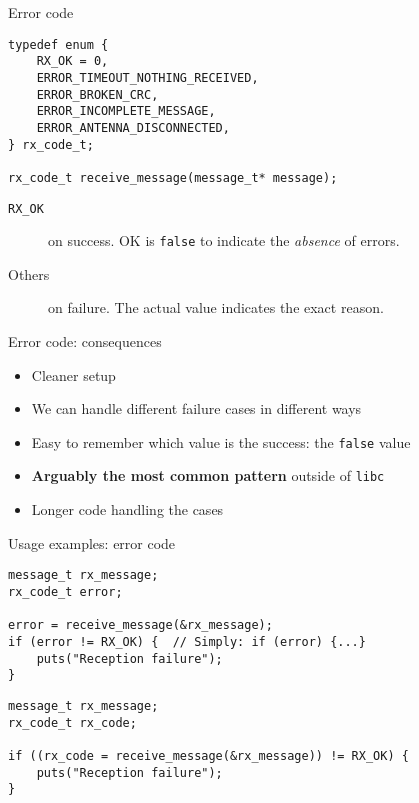 \documentclass[aspectratio=169,14pt]{beamer}
\begin{document}
\begin{frame}[fragile]{Error code}
\begin{lstlisting}[style=cstyle]
typedef enum {
    RX_OK = 0,
    ERROR_TIMEOUT_NOTHING_RECEIVED,
    ERROR_BROKEN_CRC,
    ERROR_INCOMPLETE_MESSAGE,
    ERROR_ANTENNA_DISCONNECTED,
} rx_code_t;

rx_code_t receive_message(message_t* message);
\end{lstlisting}

\begin{description}
    \item[\texttt{RX\_OK}] on success. OK is \texttt{false} to indicate the \textit{absence} of errors.
    \item[Others] on failure. The actual value indicates the exact reason.
\end{description}
\end{frame}



\begin{frame}[fragile]{Error code: consequences}
\begin{itemize}
    \item[\good] Cleaner setup
    \item[\good] We can handle different failure cases in different ways
    \item[\good] Easy to remember which value is the success: the \texttt{false} value
    \item[\good] \textbf{Arguably the most common pattern} outside of \texttt{libc}
    \item[\bad] Longer code handling the cases
\end{itemize}
\end{frame}



\begin{frame}[fragile]{Usage examples: error code}
\begin{lstlisting}[style=cstyle]
message_t rx_message;
rx_code_t error;

error = receive_message(&rx_message);
if (error != RX_OK) {  // Simply: if (error) {...}
    puts("Reception failure");
}
\end{lstlisting}

\begin{lstlisting}[style=cstyle]
message_t rx_message;
rx_code_t rx_code;

if ((rx_code = receive_message(&rx_message)) != RX_OK) {
    puts("Reception failure");
}
\end{lstlisting}
\end{frame}
\end{document}
